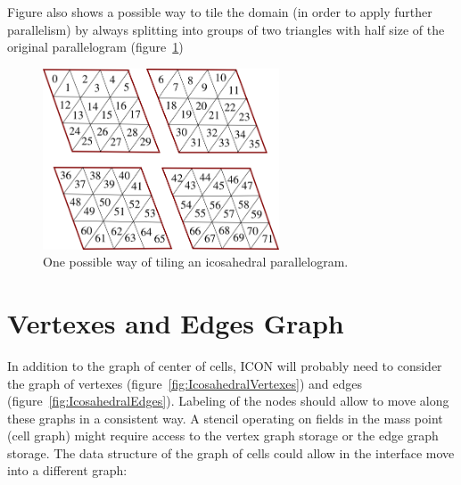 \documentclass{book}
\begin{document}
Figure also shows a possible way to tile the domain (in order to apply further parallelism) by always splitting into groups of two triangles with half size of the original parallelogram (figure~\ref{fig:IcosahedralTiling})

\begin{figure}[htb!]
	\begin{center}
		\includegraphics[width=7cm]{IcosahedralGridTiling.png}
	\caption{One possible way of tiling an icosahedral parallelogram.}
	\label{fig:IcosahedralTiling}
	\end{center}
\end{figure}
\section{Vertexes and Edges Graph}

In addition to the graph of center of cells, ICON will probably need to consider the graph of vertexes (figure~\ref{fig:IcosahedralVertexes}) and edges (figure~\ref{fig:IcosahedralEdges}). Labeling of the nodes should allow to move
along these graphs in a consistent way. 
A stencil operating on fields in the mass point (cell graph) might require access
to the vertex graph storage or the edge graph storage. 
The data structure of the graph of cells could allow in the interface move into a 
different graph:
\end{document}
